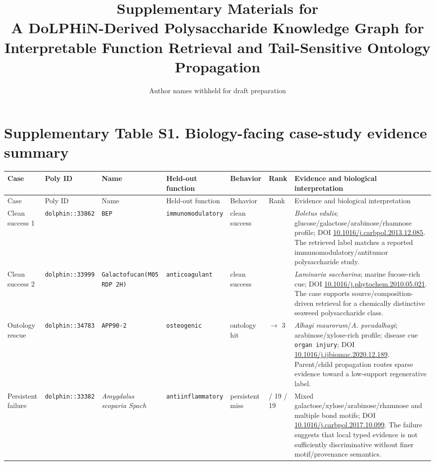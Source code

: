 \documentclass[11pt]{article}
\title{Supplementary Materials for\\A DoLPHiN-Derived Polysaccharide Knowledge Graph for Interpretable Function Retrieval and Tail-Sensitive Ontology Propagation}
\author{Author names withheld for draft preparation}
\date{}
\begin{document}
\maketitle
\setlength{\tabcolsep}{2pt}
\sloppy
\section*{Supplementary Table S1. Biology-facing case-study evidence summary}
\scriptsize
\begin{longtable}{>{\raggedright\arraybackslash}p{1.25cm}>{\raggedright\arraybackslash}p{1.25cm}>{\raggedright\arraybackslash}p{1.55cm}>{\raggedright\arraybackslash}p{1.45cm}>{\raggedright\arraybackslash}p{1.25cm}>{\raggedright\arraybackslash}p{0.9cm}>{\raggedright\arraybackslash}p{5.2cm}}
\toprule
Case & Poly ID & Name & Held-out function & Behavior & Rank & Evidence and biological interpretation \\
\midrule
\endfirsthead
\toprule
Case & Poly ID & Name & Held-out function & Behavior & Rank & Evidence and biological interpretation \\
\midrule
\endhead
Clean success 1 & \texttt{dolphin::33862} & \texttt{BEP} & \texttt{immunomodulatory} & clean success & 1 & \textit{Boletus edulis}; glucose/galactose/arabinose/rhamnose profile; DOI \url{10.1016/j.carbpol.2013.12.085}. The retrieved label matches a reported immunomodulatory/antitumor polysaccharide study. \\
Clean success 2 & \texttt{dolphin::33999} & \texttt{Galactofucan(M05 RDP 2H)} & \texttt{anticoagulant} & clean success & 1 & \textit{Laminaria saccharina}; marine fucose-rich cue; DOI \url{10.1016/j.phytochem.2010.05.021}. The case supports source/composition-driven retrieval for a chemically distinctive seaweed polysaccharide class. \\
Ontology rescue & \texttt{dolphin::34783} & \texttt{APP90-2} & \texttt{osteogenic} & ontology hit & 43 $\rightarrow$ 3 & \textit{Alhagi maurorum}/\textit{A. pseudalhagi}; arabinose/xylose-rich profile; disease cue \texttt{organ injury}; DOI \url{10.1016/j.ijbiomac.2020.12.189}. Parent/child propagation routes sparse evidence toward a low-support regenerative label. \\
Persistent failure & \texttt{dolphin::33382} & \textit{Amygdalus scoparia Spach} & \texttt{antiinflammatory} & persistent miss & 12 / 19 / 19 & Mixed galactose/xylose/arabinose/rhamnose and multiple bond motifs; DOI \url{10.1016/j.carbpol.2017.10.099}. The failure suggests that local typed evidence is not sufficiently discriminative without finer motif/provenance semantics. \\
\bottomrule
\end{longtable}
\normalsize
\end{document}
